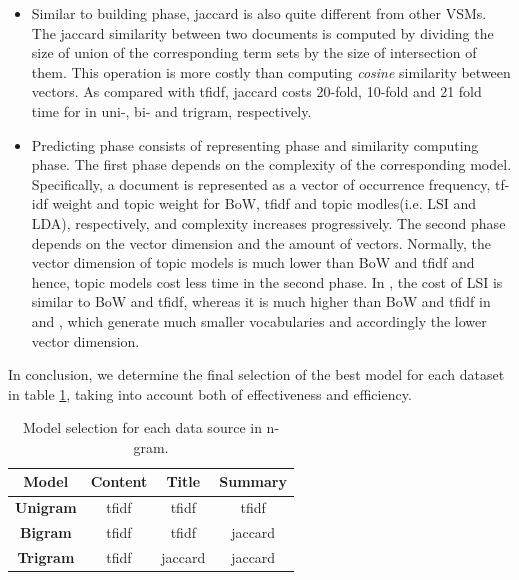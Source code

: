 \begin{itemize}
\item Similar to building phase, jaccard is also quite different from other VSMs. The jaccard similarity between two documents is computed by dividing the size of union of the corresponding term sets by the size of intersection of them. This operation is more costly than computing \textit{cosine} similarity between vectors. As compared with tfidf, jaccard costs 20-fold, 10-fold and 21 fold time for \icontent{} in uni-, bi- and trigram, respectively.

\item Predicting phase consists of representing phase and similarity computing phase. The first phase depends on the complexity of the corresponding model. Specifically, a document is represented as a vector of occurrence frequency, tf-idf weight and topic weight for BoW, tfidf and topic modles(i.e. LSI and LDA), respectively, and complexity increases progressively. The second phase depends on the vector dimension and the amount of vectors. Normally, the vector dimension of topic models is much lower than BoW and tfidf and hence, topic models cost less time in the second phase. In \icontent{}, the cost of LSI is similar to BoW and tfidf, whereas it is much higher than BoW and tfidf in \ititle{} and \isummary{}, which generate much smaller vocabularies and accordingly the lower vector dimension. 

\end{itemize} 

In conclusion, we determine the final selection of the best model for each dataset in table \ref{tab:select}, taking into account both of effectiveness and efficiency.

\begin{table}[!htb]
\centering
\begin{tabular}{|c|c|c|c|}
\hline
\textbf{Model} & \textbf{Content} & \textbf{Title} & \textbf{Summary} \\ \hline
\textbf{Unigram} & tfidf & tfidf & tfidf \\ \hline
\textbf{Bigram} & tfidf & tfidf & jaccard \\ \hline
\textbf{Trigram} & tfidf & jaccard & jaccard \\ \hline
\end{tabular}
\caption{Model selection for each data source in n-gram.}
\label{tab:select}
\end{table}

\clearpage

